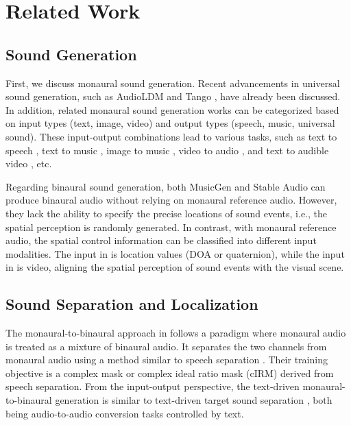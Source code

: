 \section{Related Work}
\label{sec:re}
\subsection{Sound Generation}
First, we discuss monaural sound generation. Recent advancements in universal sound generation, such as AudioLDM \cite{liu2023audioldm,liu2024audioldm} and Tango \cite{ghosal2023tango,majumder2024tango}, have already been discussed. In addition, related monaural sound generation works can be categorized based on input types (text, image, video) and output types (speech, music, universal sound). These input-output combinations lead to various tasks, such as text to speech \cite{tan2024naturalspeech}, text to music \cite{chen2024musicldm}, image to music \cite{wang2023continuous}, video to audio \cite{ghose2023foleygan}, and text to audible video \cite{liu2023sounding}, etc.

Regarding binaural sound generation, both MusicGen \cite{copet2024simple} and Stable Audio \cite{evans2024stable} can produce binaural audio without relying on monaural reference audio. However, they lack the ability to specify the precise locations of sound events, i.e., the spatial perception is randomly generated. In contrast, with monaural reference audio, the spatial control information can be classified into different input modalities. The input in \cite{richard2021neural, leng2022binauralgrad} is location values (DOA or quaternion), while the input in \cite{gao20192, li2024cross, li2024cyclic} is video, aligning the spatial perception of sound events with the visual scene.

\subsection{Sound Separation and Localization}
The monaural-to-binaural approach in \cite{gao20192, li2024cross, li2024cyclic} follows a paradigm where monaural audio is treated as a mixture of binaural audio. It separates the two channels from monaural audio using a method similar to speech separation \cite{wang2018supervised}. Their training objective is a complex mask or complex ideal ratio mask (cIRM) \cite{williamson2016complex} derived from speech separation. From the input-output perspective, the text-driven monaural-to-binaural generation is similar to text-driven target sound separation \cite{liu2022separate,liu2024separate,ma2024clapsep,ma2024language}, both being audio-to-audio conversion tasks controlled by text.

